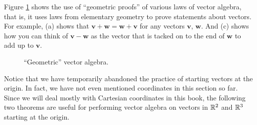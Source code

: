Figure \ref{fig:pgram} shows the use of ``geometric proofs'' of various laws of vector algebra, that is, it
uses laws from elementary geometry to prove statements about vectors.
For example, (a) shows that $\mathbf{v} + \mathbf{w} = \mathbf{w} + \mathbf{v}$ for any vectors $\mathbf{v}$,
$\mathbf{w}$. 
And (c) shows how you can think of $\mathbf{v} - \mathbf{w}$ as the vector that is tacked on to the end of
$\mathbf{w}$ to add up to $\mathbf{v}$.

\begin{figure}[h]
 \centering
 \qquad
 \qquad
 \caption[]{\quad ``Geometric'' vector algebra.}
 \label{fig:pgram}
\end{figure}

Notice that we have temporarily abandoned the practice of starting vectors at the origin. In fact, we have not even
mentioned coordinates in this section so far. Since we will deal mostly with Cartesian coordinates in this book, the
following two theorems are useful for performing vector algebra on vectors in $\mathbb{R}^{2}$ and $\mathbb{R}^{3}$
starting at the origin.


